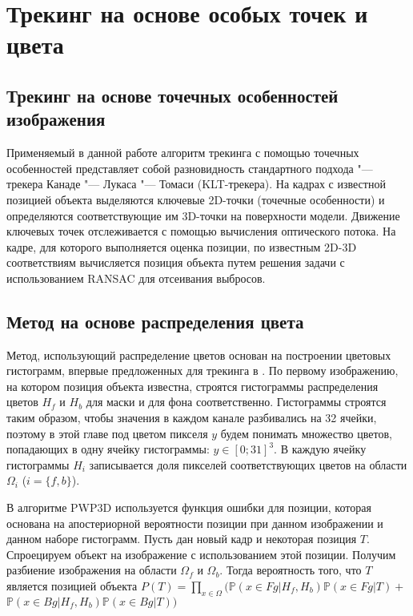 \section{Трекинг на основе особых точек и цвета}

\subsection{Трекинг на основе точечных особенностей изображения}

Применяемый в данной работе алгоритм трекинга с помощью точечных особенностей
представляет собой разновидность стандартного подхода "--- трекера
Канаде "--- Лукаса "--- Томаси
(KLT-трекера)\cite{LucasAndKanade,TomasiAndKanade,ShiAndTomasi,PyrLK}.
На кадрах с известной позицией объекта выделяются ключевые 2D-точки (точечные
особенности) и определяются соответствующие им 3D-точки на поверхности модели.
Движение ключевых точек отслеживается с помощью вычисления оптического потока.
На кадре, для которого выполняется оценка позиции, по известным 2D-3D
соответствиям вычисляется позиция объекта путем решения задачи
\PnP\cite{LepetitSurvey} с использованием RANSAC\cite{RANSAC} для отсеивания
выбросов.


\subsection{Метод на основе распределения цвета}


Метод, использующий распределение цветов основан на построении цветовых
гистограмм, впервые предложенных для трекинга в \cite{Bibby2008}.
По первому изображению, на котором позиция объекта известна, строятся
гистограммы распределения цветов $H_f$ и $H_b$ для маски и для фона
соответственно.
Гистограммы строятся таким образом, чтобы значения в каждом канале разбивались
на 32 ячейки, поэтому в этой главе под цветом пикселя $y$ будем понимать
множество цветов, попадающих в одну ячейку гистограммы: $y \in [0; 31]^3$.
В каждую ячейку гистограммы $H_i$ записывается доля пикселей соответствующих
цветов на области $\Omega_i$ ($i = \{f, b\}$).

В алгоритме PWP3D \cite{PWP3D} используется функция ошибки для позиции, которая
основана на апостериорной вероятности позиции при данном изображении и данном
наборе гистограмм.
Пусть дан новый кадр и некоторая позиция $T$.
Спроецируем объект на изображение с использованием этой позиции.
Получим разбиение изображения на области $\Omega_f$ и $\Omega_b$.
Тогда вероятность того, что $T$
является позицией объекта
$
    P(T) = \prod\limits_{x \in \Omega}(\mathbb{P}(x \in Fg | H_f, H_b)\mathbb{P}(x \in Fg | T) +$ $\mathbb{P}(x \in Bg|H_f, H_b)\mathbb{P}(x \in Bg | T))
$

